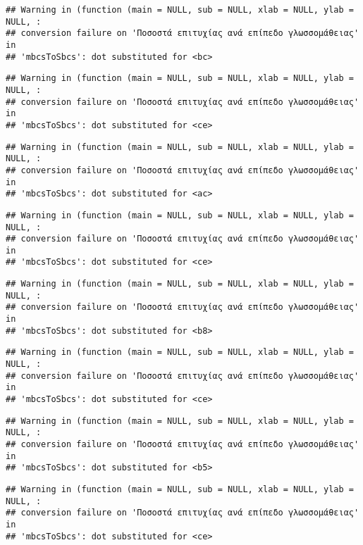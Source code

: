 \documentclass[
]{article}
\begin{document}
\begin{verbatim}
## Warning in (function (main = NULL, sub = NULL, xlab = NULL, ylab = NULL, :
## conversion failure on 'Ποσοστά επιτυχίας ανά επίπεδο γλωσσομάθειας' in
## 'mbcsToSbcs': dot substituted for <bc>
\end{verbatim}

\begin{verbatim}
## Warning in (function (main = NULL, sub = NULL, xlab = NULL, ylab = NULL, :
## conversion failure on 'Ποσοστά επιτυχίας ανά επίπεδο γλωσσομάθειας' in
## 'mbcsToSbcs': dot substituted for <ce>
\end{verbatim}

\begin{verbatim}
## Warning in (function (main = NULL, sub = NULL, xlab = NULL, ylab = NULL, :
## conversion failure on 'Ποσοστά επιτυχίας ανά επίπεδο γλωσσομάθειας' in
## 'mbcsToSbcs': dot substituted for <ac>
\end{verbatim}

\begin{verbatim}
## Warning in (function (main = NULL, sub = NULL, xlab = NULL, ylab = NULL, :
## conversion failure on 'Ποσοστά επιτυχίας ανά επίπεδο γλωσσομάθειας' in
## 'mbcsToSbcs': dot substituted for <ce>
\end{verbatim}

\begin{verbatim}
## Warning in (function (main = NULL, sub = NULL, xlab = NULL, ylab = NULL, :
## conversion failure on 'Ποσοστά επιτυχίας ανά επίπεδο γλωσσομάθειας' in
## 'mbcsToSbcs': dot substituted for <b8>
\end{verbatim}

\begin{verbatim}
## Warning in (function (main = NULL, sub = NULL, xlab = NULL, ylab = NULL, :
## conversion failure on 'Ποσοστά επιτυχίας ανά επίπεδο γλωσσομάθειας' in
## 'mbcsToSbcs': dot substituted for <ce>
\end{verbatim}

\begin{verbatim}
## Warning in (function (main = NULL, sub = NULL, xlab = NULL, ylab = NULL, :
## conversion failure on 'Ποσοστά επιτυχίας ανά επίπεδο γλωσσομάθειας' in
## 'mbcsToSbcs': dot substituted for <b5>
\end{verbatim}

\begin{verbatim}
## Warning in (function (main = NULL, sub = NULL, xlab = NULL, ylab = NULL, :
## conversion failure on 'Ποσοστά επιτυχίας ανά επίπεδο γλωσσομάθειας' in
## 'mbcsToSbcs': dot substituted for <ce>
\end{verbatim}
\end{document}
